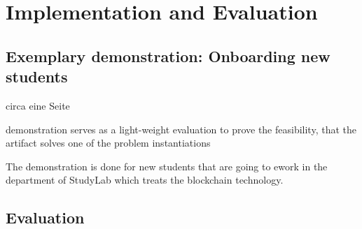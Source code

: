 \chapter{Implementation and Evaluation}

\section{Exemplary demonstration: Onboarding new students} \label{sec:demo}
circa eine Seite

demonstration serves as a light-weight evaluation to prove the feasibility, that the artifact solves one of the problem instantiations

The demonstration is done for new students that are going to ework in the department of StudyLab which treats the blockchain technology. 

\section{Evaluation} \label{sec:Evaluation}

